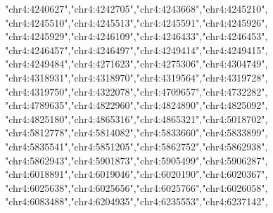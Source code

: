 \documentclass[
]{book}
\newenvironment{Shaded}{\begin{snugshade}}{\end{snugshade}}
\newcommand{\NormalTok}[1]{#1}
\newcommand{\StringTok}[1]{\textcolor[rgb]{0.31,0.60,0.02}{#1}}
\begin{document}
\begin{Shaded}
\begin{Highlighting}[]
                   \StringTok{"chr4:4240627"}\NormalTok{,}\StringTok{"chr4:4242705"}\NormalTok{,}\StringTok{"chr4:4243668"}\NormalTok{,}\StringTok{"chr4:4245210"}\NormalTok{,}
                   \StringTok{"chr4:4245510"}\NormalTok{,}\StringTok{"chr4:4245513"}\NormalTok{,}\StringTok{"chr4:4245591"}\NormalTok{,}\StringTok{"chr4:4245926"}\NormalTok{,}
                   \StringTok{"chr4:4245929"}\NormalTok{,}\StringTok{"chr4:4246109"}\NormalTok{,}\StringTok{"chr4:4246433"}\NormalTok{,}\StringTok{"chr4:4246453"}\NormalTok{,}
                   \StringTok{"chr4:4246457"}\NormalTok{,}\StringTok{"chr4:4246497"}\NormalTok{,}\StringTok{"chr4:4249414"}\NormalTok{,}\StringTok{"chr4:4249415"}\NormalTok{,}
                   \StringTok{"chr4:4249484"}\NormalTok{,}\StringTok{"chr4:4271623"}\NormalTok{,}\StringTok{"chr4:4275306"}\NormalTok{,}\StringTok{"chr4:4304749"}\NormalTok{,}
                   \StringTok{"chr4:4318931"}\NormalTok{,}\StringTok{"chr4:4318970"}\NormalTok{,}\StringTok{"chr4:4319564"}\NormalTok{,}\StringTok{"chr4:4319728"}\NormalTok{,}
                   \StringTok{"chr4:4319750"}\NormalTok{,}\StringTok{"chr4:4322078"}\NormalTok{,}\StringTok{"chr4:4709657"}\NormalTok{,}\StringTok{"chr4:4732282"}\NormalTok{,}
                   \StringTok{"chr4:4789635"}\NormalTok{,}\StringTok{"chr4:4822960"}\NormalTok{,}\StringTok{"chr4:4824890"}\NormalTok{,}\StringTok{"chr4:4825092"}\NormalTok{,}
                   \StringTok{"chr4:4825180"}\NormalTok{,}\StringTok{"chr4:4865316"}\NormalTok{,}\StringTok{"chr4:4865321"}\NormalTok{,}\StringTok{"chr4:5018702"}\NormalTok{,}
                   \StringTok{"chr4:5812778"}\NormalTok{,}\StringTok{"chr4:5814082"}\NormalTok{,}\StringTok{"chr4:5833660"}\NormalTok{,}\StringTok{"chr4:5833899"}\NormalTok{,}
                   \StringTok{"chr4:5835541"}\NormalTok{,}\StringTok{"chr4:5851205"}\NormalTok{,}\StringTok{"chr4:5862752"}\NormalTok{,}\StringTok{"chr4:5862938"}\NormalTok{,}
                   \StringTok{"chr4:5862943"}\NormalTok{,}\StringTok{"chr4:5901873"}\NormalTok{,}\StringTok{"chr4:5905499"}\NormalTok{,}\StringTok{"chr4:5906287"}\NormalTok{,}
                   \StringTok{"chr4:6018891"}\NormalTok{,}\StringTok{"chr4:6019046"}\NormalTok{,}\StringTok{"chr4:6020190"}\NormalTok{,}\StringTok{"chr4:6020367"}\NormalTok{,}
                   \StringTok{"chr4:6025638"}\NormalTok{,}\StringTok{"chr4:6025656"}\NormalTok{,}\StringTok{"chr4:6025766"}\NormalTok{,}\StringTok{"chr4:6026058"}\NormalTok{,}
                   \StringTok{"chr4:6083488"}\NormalTok{,}\StringTok{"chr4:6204935"}\NormalTok{,}\StringTok{"chr4:6235553"}\NormalTok{,}\StringTok{"chr4:6237142"}\NormalTok{,}

\end{Highlighting}
\end{Shaded}
\end{document}
